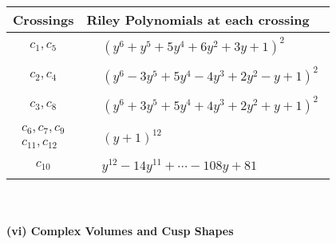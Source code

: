 \documentclass[1p]{elsarticle_modified}
\theoremstyle{definition}
\begin{document}
\begin{tabular}{m{50pt}|m{274pt}}
Crossings & \hspace{64pt}Riley Polynomials at each crossing \\
\hline $$\begin{aligned}c_{1},c_{5}\end{aligned}$$&$\begin{aligned}
&(y^6+y^5+5 y^4+6 y^2+3 y+1)^2
\end{aligned}$\\
\hline $$\begin{aligned}c_{2},c_{4}\end{aligned}$$&$\begin{aligned}
&(y^6-3 y^5+5 y^4-4 y^3+2 y^2- y+1)^2
\end{aligned}$\\
\hline $$\begin{aligned}c_{3},c_{8}\end{aligned}$$&$\begin{aligned}
&(y^6+3 y^5+5 y^4+4 y^3+2 y^2+y+1)^2
\end{aligned}$\\
\hline $$\begin{aligned}c_{6},c_{7},c_{9}\\c_{11},c_{12}\end{aligned}$$&$\begin{aligned}
&(y+1)^{12}
\end{aligned}$\\
\hline $$\begin{aligned}c_{10}\end{aligned}$$&$\begin{aligned}
&y^{12}-14 y^{11}+\cdots-108 y+81
\end{aligned}$\\
\hline
\end{tabular}\\~\\
\newpage\flushleft \textbf{(vi) Complex Volumes and Cusp Shapes}
\end{document}

